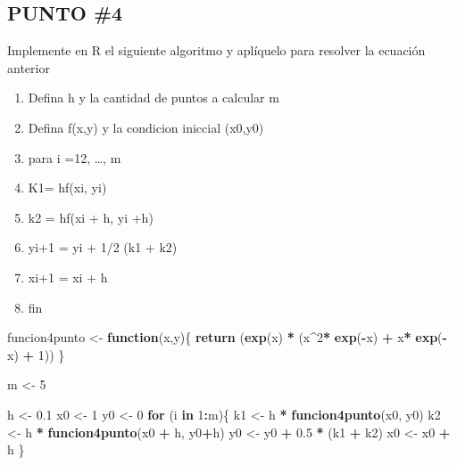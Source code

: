 \documentclass[]{article}
\newenvironment{Shaded}{\begin{snugshade}}{\end{snugshade}}
\newcommand{\KeywordTok}[1]{\textcolor[rgb]{0.13,0.29,0.53}{\textbf{#1}}}
\newcommand{\DecValTok}[1]{\textcolor[rgb]{0.00,0.00,0.81}{#1}}
\newcommand{\FloatTok}[1]{\textcolor[rgb]{0.00,0.00,0.81}{#1}}
\newcommand{\StringTok}[1]{\textcolor[rgb]{0.31,0.60,0.02}{#1}}
\newcommand{\ControlFlowTok}[1]{\textcolor[rgb]{0.13,0.29,0.53}{\textbf{#1}}}
\newcommand{\OperatorTok}[1]{\textcolor[rgb]{0.81,0.36,0.00}{\textbf{#1}}}
\newcommand{\NormalTok}[1]{#1}
\providecommand{\tightlist}{%
  \setlength{\itemsep}{0pt}\setlength{\parskip}{0pt}}
\begin{document}
\subsection{PUNTO \#4}\label{punto-4}

Implemente en R el siguiente algoritmo y aplíquelo para resolver la
ecuación anterior

\begin{enumerate}
\def\labelenumi{\arabic{enumi})}
\tightlist
\item
  Defina h y la cantidad de puntos a calcular m
\item
  Defina f(x,y) y la condicion iniccial (x0,y0)
\item
  para i =12, \ldots{}, m
\item
  K1= hf(xi, yi)
\item
  k2 = hf(xi + h, yi +h)
\item
  yi+1 = yi + 1/2 (k1 + k2)
\item
  xi+1 = xi + h
\item
  fin
\end{enumerate}

\begin{Shaded}
\begin{Highlighting}[]
\NormalTok{funcion4punto <-}\StringTok{ }\ControlFlowTok{function}\NormalTok{(x,y)\{}
  \KeywordTok{return}\NormalTok{  (}\KeywordTok{exp}\NormalTok{(x) }\OperatorTok{*}\StringTok{ }\NormalTok{(x}\OperatorTok{^}\DecValTok{2}\OperatorTok{*}\StringTok{ }\KeywordTok{exp}\NormalTok{(}\OperatorTok{-}\NormalTok{x) }\OperatorTok{+}\StringTok{ }\NormalTok{x}\OperatorTok{*}\StringTok{ }\KeywordTok{exp}\NormalTok{(}\OperatorTok{-}\NormalTok{x) }\OperatorTok{+}\StringTok{ }\DecValTok{1}\NormalTok{))}
\NormalTok{\}}

\NormalTok{m <-}\StringTok{ }\DecValTok{5}
  
\NormalTok{h <-}\StringTok{ }\FloatTok{0.1}
\NormalTok{ x0 <-}\StringTok{ }\DecValTok{1}
\NormalTok{ y0 <-}\StringTok{ }\DecValTok{0}
\ControlFlowTok{for}\NormalTok{ (i  }\ControlFlowTok{in} \DecValTok{1}\OperatorTok{:}\NormalTok{m)\{}
\NormalTok{  k1 <-}\StringTok{ }\NormalTok{h }\OperatorTok{*}\StringTok{ }\KeywordTok{funcion4punto}\NormalTok{(x0, y0)}
\NormalTok{  k2 <-}\StringTok{ }\NormalTok{h }\OperatorTok{*}\StringTok{ }\KeywordTok{funcion4punto}\NormalTok{(x0 }\OperatorTok{+}\StringTok{ }\NormalTok{h, y0}\OperatorTok{+}\NormalTok{h)}
\NormalTok{  y0 <-}\StringTok{ }\NormalTok{y0 }\OperatorTok{+}\StringTok{ }\FloatTok{0.5} \OperatorTok{*}\StringTok{ }\NormalTok{(k1 }\OperatorTok{+}\StringTok{ }\NormalTok{k2)}
\NormalTok{  x0 <-}\StringTok{ }\NormalTok{x0 }\OperatorTok{+}\StringTok{ }\NormalTok{h}
\NormalTok{ \}}
\end{Highlighting}
\end{Shaded}
\end{document}
